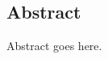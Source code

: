 \begin{preface}

\section{Abstract}

Abstract goes here.

\begin{flushright}
\makeatletter
	\@author
\makeatother
\end{flushright}

\newpage

\tableofcontents

\newpage

\listoftables

\newpage

\listoffigures

\end{preface}